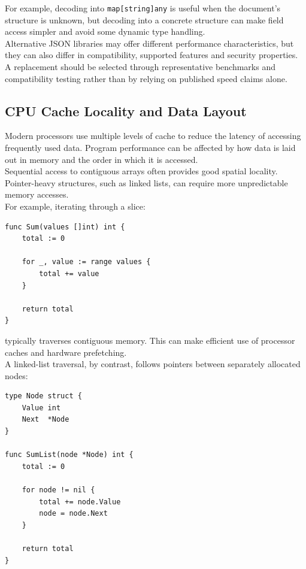 For example, decoding into \texttt{map[string]any} is useful when the document's structure is unknown, but decoding into a concrete structure can make field access simpler and avoid some dynamic type handling.\\

Alternative JSON libraries may offer different performance characteristics, but they can also differ in compatibility, supported features and security properties. A replacement should be selected through representative benchmarks and compatibility testing rather than by relying on published speed claims alone.\\

\subsection{CPU Cache Locality and Data Layout}

Modern processors use multiple levels of cache to reduce the latency of accessing frequently used data. Program performance can be affected by how data is laid out in memory and the order in which it is accessed.\\

Sequential access to contiguous arrays often provides good spatial locality. Pointer-heavy structures, such as linked lists, can require more unpredictable memory accesses.\\

For example, iterating through a slice:

\begin{lstlisting}
func Sum(values []int) int {
    total := 0

    for _, value := range values {
        total += value
    }

    return total
}
\end{lstlisting}

typically traverses contiguous memory. This can make efficient use of processor caches and hardware prefetching.\\

A linked-list traversal, by contrast, follows pointers between separately allocated nodes:

\begin{lstlisting}
type Node struct {
    Value int
    Next  *Node
}

func SumList(node *Node) int {
    total := 0

    for node != nil {
        total += node.Value
        node = node.Next
    }

    return total
}
\end{lstlisting}

